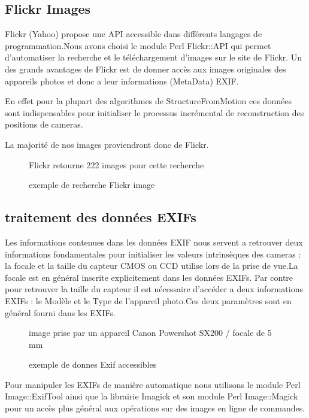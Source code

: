 \documentclass[a4paper,10pt,french]{sphinxhowto}
\begin{document}
\subsection{\textbf{Flickr Images}}
\label{collection:flickr-images}
Flickr (Yahoo) propose une API accessible dans différents langages de programmation.Nous avons choisi le module Perl Flickr::API qui permet d'automatiser la recherche et le téléchargement d'images sur le site de Flickr. Un des grands avantages de Flickr est de donner accès aux images originales des appareils photos et donc a leur informations (MetaData) EXIF.

En effet pour la plupart des algorithmes de StructureFromMotion ces données sont indispensables pour initialiser le processus incrémental de reconstruction des positions de cameras.

La majorité de nos images proviendront donc de Flickr.
\begin{figure}[htbp]
\centering
\capstart

\caption{exemple de recherche Flickr image}{\small 
Flickr retourne 222 images pour cette recherche
}\end{figure}


\subsection{\textbf{traitement des données EXIFs}}
\label{collection:traitement-des-donnees-exifs}
Les informations contenues dans les données EXIF nous servent a retrouver deux informations fondamentales pour initialiser les valeurs intrinsèques des cameras : la focale et la taille du capteur CMOS ou CCD utilise lors de la prise de vue.La focale est en général inscrite explicitement dans les données EXIFs. Par contre pour retrouver la taille du capteur il est nécessaire d’accéder a deux informations EXIFs : le Modèle et le Type de l'appareil photo.Ces deux paramètres sont en général fourni dans les EXIFs.
\begin{figure}[htbp]
\centering
\capstart

\caption{exemple de donnes Exif accessibles}{\small 
image prise par un appareil Canon Powershot SX200 / focale de 5 mm
}\end{figure}

Pour manipuler les EXIFs de manière automatique nous utilisons le module Perl Image::ExifTool ainsi que la librairie Imagick et son module Perl Image::Magick pour un accès plus général aux opérations sur des images en ligne de commandes.
\end{document}
